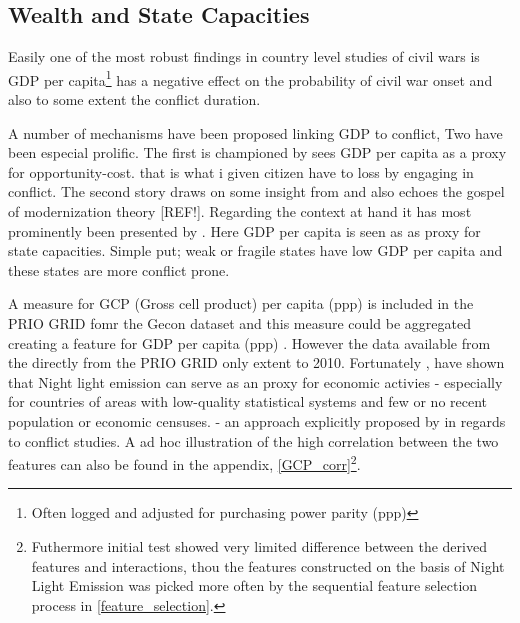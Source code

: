 \documentclass[a4paper]{article}
\begin{document}
\subsection{Wealth and State Capacities} %

 Easily one of the most robust findings in country level studies of civil wars is GDP per capita\footnote{Often logged and adjusted for purchasing power parity (ppp)} has a negative effect on the probability of civil war onset \citep{Collier_Hoeffler_1998, Fearon_Laitin_2003, Collier_Hoeffler_2004, Hegre_Sambanis_2006, Blattman_Miguel_2010} and also to some extent the conflict duration\citep{Fearon_2004, Hegre_Oestby_Raleigh_2009}.\par
 
 A number of mechanisms have been proposed linking GDP to conflict, Two have been especial prolific. The first is championed by \cite{Collier_Hoeffler_1998, Collier_Hoeffler_2004} sees GDP per capita as a proxy for opportunity-cost. that is what i given citizen have to loss by engaging in conflict. The second story draws on some insight from \cite{Skocpol_1979} and also echoes the gospel of modernization theory [REF!]. Regarding the context at hand it has most prominently been presented by \cite{Fearon_Laitin_2003}. Here GDP per capita is seen as as proxy for state capacities. Simple put; weak or fragile states have low GDP per capita and these states are more conflict prone\citep[88]{Fearon_Laitin_2003}.\par
 
 A measure for GCP (Gross cell product) per capita (ppp) is included in the PRIO GRID fomr the Gecon dataset \citep{Nordhaus_2006} and this measure could be aggregated creating a feature for GDP per capita (ppp) \citep{prio_code_2015}. However the data available from the directly from the PRIO GRID only extent to 2010. Fortunately \cite{Elvidge_2009}, \cite{Chen_Nordhuas_2011} have shown that Night light emission can serve as an proxy for economic activies - especially for countries of areas with low-quality statistical systems and few or no recent population or economic censuses. \citep{Chen_Nordhuas_2011} - an approach explicitly proposed by \cite[p. 101]{Cederman_Gleditsch_Buhaug_2013} in regards to conflict studies. A ad hoc illustration of the high correlation between the two features can also be found in the appendix, \autoref{GCP_corr}\footnote{Futhermore initial test showed very limited difference between the derived features and interactions, thou the features constructed on the basis of Night Light Emission was picked more often by the sequential feature selection process in \autoref{feature_selection}.}.\par
 
\end{document}
